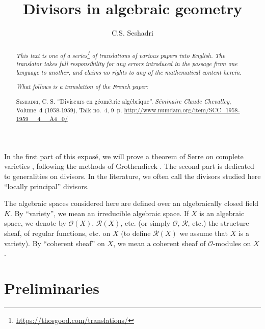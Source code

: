 \documentclass{article}
\title{Divisors in algebraic geometry}
\author{C.S. Seshadri}
\date{}
\theoremstyle{plain}
\theoremstyle{definition}
\newcommand{\sh}{\mathscr}
\newcommand{\oldpage}[1]{\marginpar{\footnotesize$\Big\vert$ \textit{p.~#1}}}
\begin{document}
\maketitle
\thispagestyle{fancy}

\renewcommand{\abstractname}{Translator's note.}

\begin{abstract}
  \renewcommand*{\thefootnote}{\fnsymbol{footnote}}
  \emph{This text is one of a series\footnote{\url{https://thosgood.com/translations/}} of translations of various papers into English.}
  \emph{The translator takes full responsibility for any errors introduced in the passage from one language to another, and claims no rights to any of the mathematical content herein.}

  \medskip
  
  \emph{What follows is a translation of the French paper:}

  \medskip\noindent
  \textsc{Seshadri, C. S.}
  ``Diviseurs en g\'{e}om\'{e}trie alg\'{e}brique''.
  \emph{S\'{e}minaire Claude Chevalley}, Volume~\textbf{4} (1958-1959), Talk no.~4, 9~p.
  {\footnotesize\url{http://www.numdam.org/item/SCC_1958-1959__4__A4_0/}}
\end{abstract}

\setcounter{footnote}{0}

\tableofcontents
\bigskip



\oldpage{4-01}
In the first part of this expos\'{e}, we will prove a theorem of Serre on complete varieties \cite{6}, following the methods of Grothendieck \cite{4}.
The second part is dedicated to generalities on divisors.
In the literature, we often call the divisors studied here ``locally principal'' divisors.

The algebraic spaces considered here are defined over an algebraically closed field $K$.
By ``variety'', we mean an irreducible algebraic space.
If $X$ is an algebraic space, we denote by $\sh{O}(X)$, $\sh{R}(X)$, etc. (or simply $\sh{O}$, $\sh{R}$, etc.) the structure sheaf, of regular functions, etc. on $X$ (to define $\sh{R}(X)$ we assume that $X$ is a variety).
By ``coherent sheaf'' on $X$, we mean a coherent sheaf of $\sh{O}$-modules on $X$.


\section{Preliminaries}
\label{section1}

\cite{4,5,6}
\medskip
\end{document}
